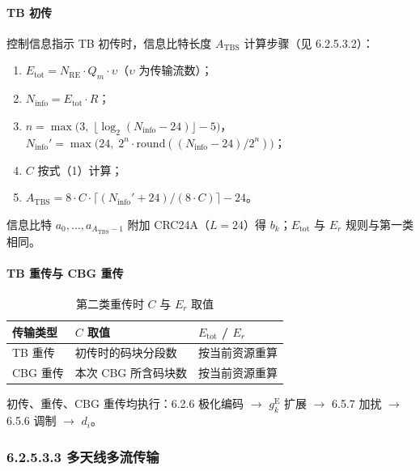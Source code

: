 \documentclass[11pt,a4paper]{ctexart}
\begin{document}
\paragraph{TB 初传}

控制信息指示 TB 初传时，信息比特长度 $A_{\mathrm{TBS}}$ 计算步骤（见 6.2.5.3.2）：
\begin{enumerate}[nosep]
  \item $E_{\mathrm{tot}} = N_{\mathrm{RE}} \cdot Q_m \cdot \upsilon$（$\upsilon$ 为传输流数）；
  \item $N_{\mathrm{info}} = E_{\mathrm{tot}} \cdot R$；
  \item $n = \max\bigl(3,\; \lfloor \log_2(N_{\mathrm{info}} - 24) \rfloor - 5\bigr)$，
        $N_{\mathrm{info}}' = \max\!\bigl(24,\; 2^n \cdot \mathrm{round}((N_{\mathrm{info}}-24)/2^n)\bigr)$；
  \item $C$ 按式（1）计算；
  \item $A_{\mathrm{TBS}} = 8 \cdot C \cdot \lceil (N_{\mathrm{info}}' + 24) / (8 \cdot C) \rceil - 24$。
\end{enumerate}
信息比特 $a_0,\ldots,a_{A_{\mathrm{TBS}}-1}$ 附加 CRC24A（$L=24$）得 $b_k$；$E_{\mathrm{tot}}$ 与 $E_r$ 规则与第一类相同。

\paragraph{TB 重传与 CBG 重传}

\begin{table}[h]
\centering
\small
\caption{第二类重传时 $C$ 与 $E_r$ 取值}
\begin{tabular}{L{3cm}L{4.5cm}L{4cm}}
\toprule
\textbf{传输类型} & \textbf{$C$ 取值} & \textbf{$E_{\mathrm{tot}}$ / $E_r$} \\
\midrule
TB 重传 & 初传时的码块分段数 & 按当前资源重算 \\
CBG 重传 & 本次 CBG 所含码块数 & 按当前资源重算 \\
\bottomrule
\end{tabular}
\end{table}

初传、重传、CBG 重传均执行：6.2.6 极化编码 $\rightarrow$ $g^{\mathrm{E}}_k$ 扩展 $\rightarrow$ 6.5.7 加扰 $\rightarrow$ 6.5.6 调制 $\rightarrow$ $d_i$。

\subsubsection{6.2.5.3.3 多天线多流传输}
\end{document}
